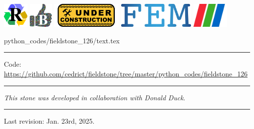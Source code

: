 \noindent
\includegraphics[height=1.25cm]{images/pictograms/replication}
\includegraphics[height=1.25cm]{images/pictograms/benchmark}
\includegraphics[height=1.25cm]{images/pictograms/under_construction}
\includegraphics[height=1.25cm]{images/pictograms/FEM}
\includegraphics[height=1.25cm]{images/pictograms/paraview}


\begin{flushright} {\tiny {\color{gray} python\_codes/fieldstone\_126/text.tex}} \end{flushright}

%

\par\noindent\rule{\textwidth}{0.4pt}

\begin{center}
\inpython
{\small Code: \url{https://github.com/cedrict/fieldstone/tree/master/python_codes/fieldstone_126}}
\end{center}

\par\noindent\rule{\textwidth}{0.4pt}

{\sl This stone was developed in collaboration with Donald Duck}. 

\par\noindent\rule{\textwidth}{0.4pt}

Last revision: Jan. 23rd, 2025.

